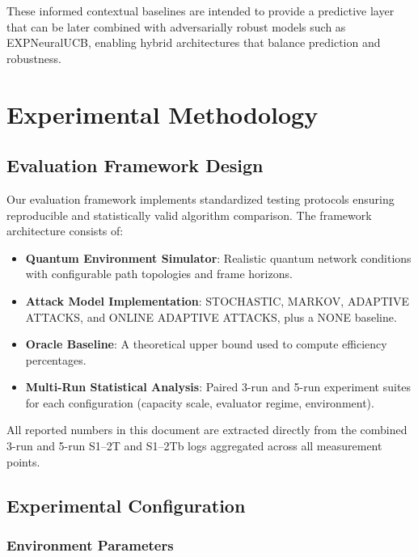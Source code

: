 \documentclass[12pt,a4paper]{article}
\begin{document}
These informed contextual baselines are intended to provide a predictive layer that can be later combined with adversarially robust models such as EXPNeuralUCB, enabling hybrid architectures that balance prediction and robustness.

\section{Experimental Methodology}

\subsection{Evaluation Framework Design}

Our evaluation framework implements standardized testing protocols ensuring reproducible and statistically valid algorithm comparison. The framework architecture consists of:

\begin{itemize}
\item \textbf{Quantum Environment Simulator}: Realistic quantum network conditions with configurable path topologies and frame horizons.
\item \textbf{Attack Model Implementation}: STOCHASTIC, MARKOV, ADAPTIVE ATTACKS, and ONLINE ADAPTIVE ATTACKS, plus a NONE baseline.
\item \textbf{Oracle Baseline}: A theoretical upper bound used to compute efficiency percentages.
\item \textbf{Multi-Run Statistical Analysis}: Paired 3-run and 5-run experiment suites for each configuration (capacity scale, evaluator regime, environment).
\end{itemize}

All reported numbers in this document are extracted directly from the combined 3-run and 5-run S1–2T and S1–2Tb logs aggregated across all measurement points.

\subsection{Experimental Configuration}

\subsubsection{Environment Parameters}
\end{document}
